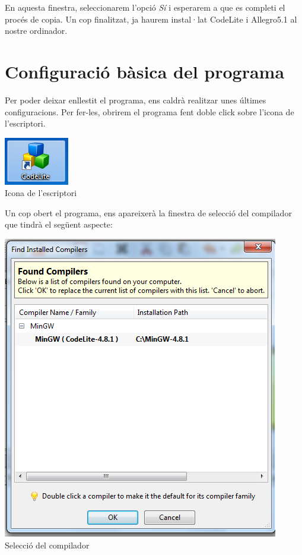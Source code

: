 \documentclass[11pt]{article}
\begin{document}
\noindent En aquesta finestra, seleccionarem l'opció \textit{Sí} i esperarem a que es completi el procés de copia. Un cop finalitzat, ja haurem instal·lat CodeLite i Allegro5.1 al nostre ordinador.

\newpage
\section{Configuració bàsica del programa}
Per poder deixar enllestit el programa, ens caldrà realitzar unes últimes configuracions. Per fer-les, obrirem el programa fent doble click sobre l'icona
de l'escriptori.

\begin{center}
	\includegraphics[scale=0.5]{img/Icono.png}\\
	\small{Icona de l'escriptori}
\end{center}

\noindent Un cop obert el programa, ens apareixerà la finestra de selecció del compilador que tindrà el següent aspecte:

\begin{center}
\includegraphics[scale=0.5]{img/Select_Compiler.png}\\
\small{Selecció del compilador}
\end{center}
\end{document}
